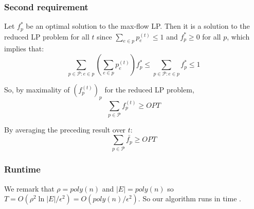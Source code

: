 \documentclass[a4paper, 11pt]{article}
\begin{document}
\subsubsection*{Second requirement}

Let $f_p^*$ be an optimal solution to the max-flow LP. Then it is a solution to the reduced LP problem for all $t$ since $\sum_{e \in p} p_e^{(t)} \le 1$ and $f_p^* \ge 0$ for all $p$, which implies that:
$$\sum_{p\in \mathcal{P}:e\in p}\left(\sum_{e \in p} p_e^{(t)}\right)f_p^* \le \sum_{p \in \mathcal{P} : e\in p} f_p^* \le 1$$

So, by maximality of $(f_p^{(t)})_p$ for the reduced LP problem,
$$\sum_{p \in \mathcal{P}}f_p^{(t)} \ge OPT$$

By averaging the preceding result over $t$:
$$\boxed{\sum_{p \in \mathcal{P}}\bar{f_p} \ge OPT}$$

\subsubsection*{Runtime}

We remark that $\rho = poly(n)$ and $|E|=poly(n)$ so $T = O(\rho^2\ln{|E|}/\epsilon^2) = O(poly(n)/\epsilon^2)$. So our algorithm runs in time .
\end{document}
